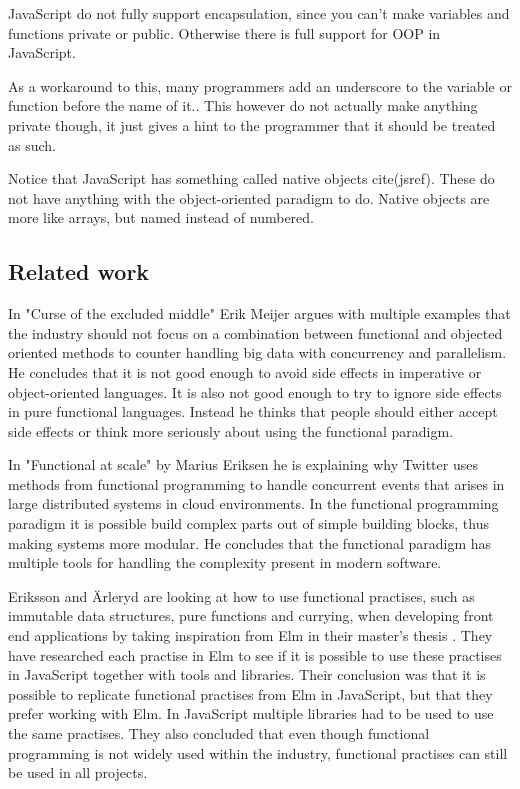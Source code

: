 \documentclass {article}
\begin{document}
JavaScript do not fully support encapsulation, since you can't make variables and functions private or public. Otherwise there is full support for OOP in JavaScript.

As a workaround to this, many programmers add an underscore to the variable or function before the name of it.. This however do not actually make anything private though, it just gives a hint to the programmer that it should be treated as such.

Notice that JavaScript has something called native objects cite(jsref). These do not have anything with the object-oriented paradigm to do. Native objects are more like arrays, but named instead of numbered.
\subsection{Related work}
In "Curse of the excluded middle" \cite{meijer} Erik Meijer argues with multiple examples that the industry should not focus on a combination between functional and objected oriented methods to counter handling big data with concurrency and parallelism. He concludes that it is not good enough to avoid side effects in imperative or object-oriented languages. It is also not good enough to try to ignore side effects in pure functional languages. Instead he thinks that people should either accept side effects or think more seriously about using the functional paradigm.

In "Functional at scale" \cite{eriksen} by Marius Eriksen he is explaining why Twitter uses methods from functional programming to handle concurrent events that arises in large distributed systems in cloud environments. In the functional programming paradigm it is possible build complex parts out of simple building blocks, thus making systems more modular. He concludes that the functional paradigm has multiple tools for handling the complexity present in modern software.

Eriksson and \"{A}rleryd are looking at how to use functional practises, such as immutable data structures, pure functions and currying, when developing front end applications by taking inspiration from Elm \cite{elm} in their master's thesis \cite{erikarl}. They have researched each practise in Elm to see if it is possible to use these practises in JavaScript together with tools and libraries. Their conclusion was that it is possible to replicate functional practises from Elm in JavaScript, but that they prefer working with Elm. In JavaScript multiple libraries had to be used to use the same practises. They also concluded that even though functional programming is not widely used within the industry, functional practises can still be used in all projects.
\end{document}
